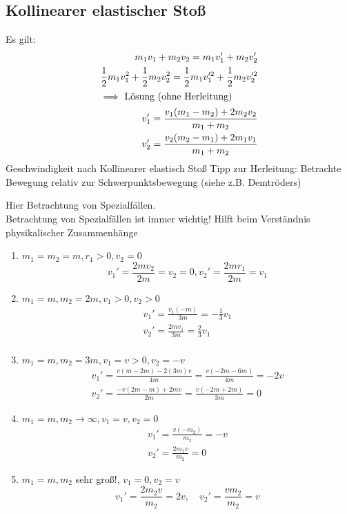 \documentclass[a4paper]{scrartcl}
\theoremstyle{definition}
\theoremstyle{plain}
\theoremstyle{plain}
\theoremstyle{remark}
\theoremstyle{remark}
\theoremstyle{remark}
\begin{document}
\subsection{Kollinearer elastischer Stoß}
\label{sec-7-1}
Es gilt:
\begin{align*}
m_1 v_1 + m_2 v_2 = m_1 v_1' + m_2 v_2' \\
\frac{1}{2} m_1 v_1^2 + \frac{1}{2} m_2 v_2^2 = \frac{1}{2} m_1 v_1^{\prime 2} + \frac{1}{2} m_2 v_2^{\prime 2} \\
\intertext{$\implies$ Lösung (ohne Herleitung)}
v_1' = \frac{v_1(m_1 - m_2) + 2m_2 v_2}{m_1 + m_2} \\
v_2' = \frac{v_2(m_2 - m_1) + 2m_1 v_1}{m_1 + m_2}
\end{align*}
Geschwindigkeit nach Kollinearer elastisch Stoß
Tipp zur Herleitung: Betrachte Bewegung relativ zur Schwerpunktsbewegung (siehe z.B. Demtröders)

Hier Betrachtung von Spezialfällen. \\
   Betrachtung von Spezialfällen ist immer wichtig! Hilft beim Verständnis physikalischer Zusammenhänge
\begin{enumerate}
\item $m_1 = m_2 = m, r_1 > 0, v_2 = 0$
          \[v_1' = \frac{2 m v_2}{2 m} = v_2 = 0, v_2' = \frac{2m r_1}{2 m} = v_1\]
\item $m_1 = m, m_2 = 2 m, v_1 > 0, v_2 > 0$
\begin{align*}
v_1' = \frac{v_1 (- m)}{3 m} = - \frac{1}{3}v_1 \\
v_2' = \frac{2m v_1}{3 m} = \frac{2}{3}v_1 \\
\end{align*}
\item $m_1 = m, m_2 = 3m, v_1 = v > 0, v_2 = -v$
\begin{align*}
v_1' = \frac{v(m - 2m) - 2(3m) v}{4m} = \frac{v(-2m - 6m)}{4m} = -2v \\
v_2' = \frac{-v(2m - m) + 2mv}{2m} = \frac{v(-2m + 2m)}{3m} = 0
\end{align*}
\item $m_1 = m, m_2 \to \infty, v_1 = v, v_2 = 0$
\begin{align*}
v_1' = \frac{v(-m_2)}{m_2} = -v \tag{da $m_1$ vernachlässigbar} \\
v_2' = \frac{2 m_1 v}{m_2} = 0 \tag{da $m_1 \ll m_2$}
\end{align*}
\item $m_1 = m, m_2$ sehr groß!, $v_1 = 0, v_2 = v$
          \[v_1' = \frac{2m_2 v}{m_2} = 2v,\quad v_2' = \frac{v m_2}{m_2} = v\]
\end{enumerate}
\end{document}
